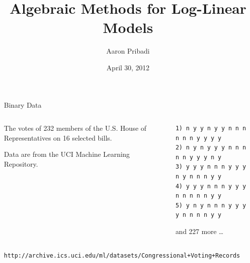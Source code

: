 \documentclass[xcolor=dvipsnames]{beamer}
\title{Algebraic Methods for Log-Linear Models}
\author{Aaron Pribadi}
\institute[HMC]{Harvey Mudd College \\ Presentation Days}
\date{April 30, 2012}
\begin{document}
\begin{frame}[plain]
    \maketitle
\end{frame}


\begin{frame}[fragile]{Binary Data}

    \lspace
    \lspace
    \begin{columns}

    \begin{column}{0.42\textwidth}
        The votes of 232 members of the U.S. House of Representatives on
        16 selected bills.  
        
        Data are from the UCI Machine Learning Repository.
    \end{column}

    \begin{column}{0.58\textwidth}
    \begin{center}
    \begin{verbatim}
1) n y y n y y n n n n n n y y y y
2) n y n y y y n n n n n y y y n y
3) y y y n n n y y y n y n n n y y
4) y y y n n n y y y n n n n n y y
5) y n y n n n y y y y n n n n y y
    \end{verbatim}
    and 227 more \ldots
    \end{center}
    \end{column}

    \end{columns}
        
    \lspace
    {\footnotesize
    \texttt{http://archive.ics.uci.edu/ml/datasets/Congressional+Voting+Records}
    }

\end{frame}
\end{document}
